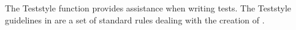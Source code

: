 The Teststyle function provides assistance when writing tests. The Teststyle guidelines in \app{} are a set of standard rules dealing with the creation of \gdsuites{}. 


